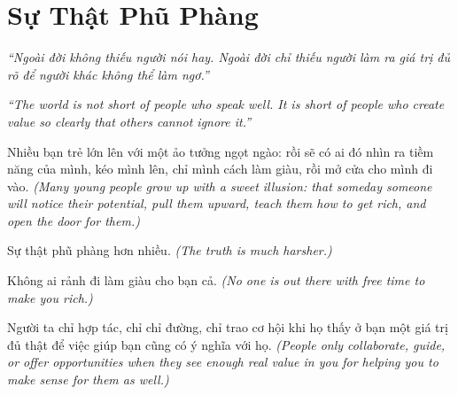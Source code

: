 \chapter{Sự Thật Phũ Phàng}

\begin{center}
	\textit{\color{bookprimary}``Ngoài đời không thiếu người nói hay. Ngoài đời chỉ thiếu người làm ra giá trị đủ rõ để người khác không thể làm ngơ.''}

	\textit{\color{bookprimary}``The world is not short of people who speak well. It is short of people who create value so clearly that others cannot ignore it.''}
\end{center}

\ngancach

\begin{tcolorbox}[
	colback=bookprimary!6,
	colframe=bookprimary!35,
	arc=5pt,
	title={\bfseries Góc Suy Nghĩ},
	fonttitle=\bfseries\color{bookprimary}
]
Nhiều bạn trẻ lớn lên với một ảo tưởng ngọt ngào: rồi sẽ có ai đó nhìn ra tiềm năng của mình, kéo mình lên, chỉ mình cách làm giàu, rồi mở cửa cho mình đi vào.
\textit{(Many young people grow up with a sweet illusion: that someday someone will notice their potential, pull them upward, teach them how to get rich, and open the door for them.)}

Sự thật phũ phàng hơn nhiều.
\textit{(The truth is much harsher.)}

Không ai rảnh đi làm giàu cho bạn cả.
\textit{(No one is out there with free time to make you rich.)}

Người ta chỉ hợp tác, chỉ chỉ đường, chỉ trao cơ hội khi họ thấy ở bạn một giá trị đủ thật để việc giúp bạn cũng có ý nghĩa với họ.
\textit{(People only collaborate, guide, or offer opportunities when they see enough real value in you for helping you to make sense for them as well.)}
\end{tcolorbox}

